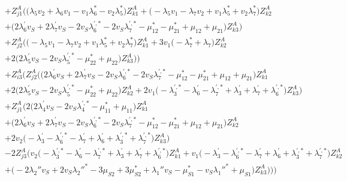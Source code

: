 \begin{align}
 &+Z_{{j 1}}^{A} \Big(\Big(\lambda_5 v_2  + \lambda_6 v_1  - v_1 \lambda_6^*  - v_2 \lambda_5^* \Big)Z_{{k 1}}^{A} +\Big(- \lambda_5 v_1  - \lambda_7 v_2  + v_1 \lambda_5^*  + v_2 \lambda_7^* \Big)Z_{{k 2}}^{A} \nonumber \\ 
 &+\Big(2 \lambda^{\prime}_6 v_S  + 2 \lambda^{\prime}_7 v_S  -2 v_S \lambda^{{\prime},*}_6  -2 v_S \lambda^{{\prime},*}_7  - \mu_{12}^*  - \mu_{21}^*  + \mu_{12} + \mu_{21}\Big)Z_{{k 3}}^{A} \Big)\nonumber \\ 
 &+Z_{{j 2}}^{A} \Big(\Big(- \lambda_5 v_1  - \lambda_7 v_2  + v_1 \lambda_5^*  + v_2 \lambda_7^* \Big)Z_{{k 1}}^{A} +3 v_1 \Big(- \lambda_7^*  + \lambda_7\Big)Z_{{k 2}}^{A} \nonumber \\ 
 &+2 \Big(2 \lambda^{\prime}_5 v_S  -2 v_S \lambda^{{\prime},*}_5  - \mu_{22}^*  + \mu_{22}\Big)Z_{{k 3}}^{A} \Big)\Big)\nonumber \\ 
 &+Z_{{i 3}}^{A} \Big(Z_{{j 2}}^{A} \Big(\Big(2 \lambda^{\prime}_6 v_S  + 2 \lambda^{\prime}_7 v_S  -2 v_S \lambda^{{\prime},*}_6  -2 v_S \lambda^{{\prime},*}_7  - \mu_{12}^*  - \mu_{21}^*  + \mu_{12} + \mu_{21}\Big)Z_{{k 1}}^{A} \nonumber \\ 
 &+2 \Big(2 \lambda^{\prime}_5 v_S  -2 v_S \lambda^{{\prime},*}_5  - \mu_{22}^*  + \mu_{22}\Big)Z_{{k 2}}^{A} +2 v_1 \Big(- \lambda^{{\prime},*}_3  - \lambda^{\prime}_6  - \lambda^{{\prime},*}_7  + \lambda^{\prime}_3 + \lambda^{\prime}_7 + \lambda^{{\prime},*}_6\Big)Z_{{k 3}}^{A} \Big)\nonumber \\ 
 &+Z_{{j 1}}^{A} \Big(2 \Big(2 \lambda^{\prime}_4 v_S  -2 v_S \lambda^{{\prime},*}_4  - \mu_{11}^*  + \mu_{11}\Big)Z_{{k 1}}^{A} \nonumber \\ 
 &+\Big(2 \lambda^{\prime}_6 v_S  + 2 \lambda^{\prime}_7 v_S  -2 v_S \lambda^{{\prime},*}_6  -2 v_S \lambda^{{\prime},*}_7  - \mu_{12}^*  - \mu_{21}^*  + \mu_{12} + \mu_{21}\Big)Z_{{k 2}}^{A} \nonumber \\ 
 &+2 v_2 \Big(- \lambda^{\prime}_3  - \lambda^{{\prime},*}_6  - \lambda^{\prime}_7  + \lambda^{\prime}_6 + \lambda^{{\prime},*}_3 + \lambda^{{\prime},*}_7\Big)Z_{{k 3}}^{A} \Big)\nonumber \\ 
 &-2 Z_{{j 3}}^{A} \Big(v_2 \Big(- \lambda^{{\prime},*}_3  - \lambda^{\prime}_6  - \lambda^{{\prime},*}_7  + \lambda^{\prime}_3 + \lambda^{\prime}_7 + \lambda^{{\prime},*}_6\Big)Z_{{k 1}}^{A} +v_1 \Big(- \lambda^{\prime}_3  - \lambda^{{\prime},*}_6  - \lambda^{\prime}_7  + \lambda^{\prime}_6 + \lambda^{{\prime},*}_3 + \lambda^{{\prime},*}_7\Big)Z_{{k 2}}^{A} \nonumber \\ 
 &+\Big(-2 \lambda_2'' v_S  + 2 v_S \lambda_2''^*  -3 \mu_{S2}  + 3 \mu_{S2}^*  + \lambda_1'' v_S  - \mu_{S1}^*  - v_S \lambda_1''^*  + \mu_{S1}\Big)Z_{{k 3}}^{A} \Big)\Big)\Big)\end{align} 
